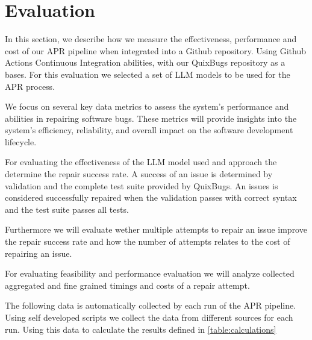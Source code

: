 \section{Evaluation} \label{section:evaluation}

In this section, we describe how we measure the effectiveness, performance and cost of our APR pipeline when integrated into a Github repository. Using Github Actions Continuous Integration abilities, with our QuixBugs repository as a bases.  For this evaluation we selected a set of LLM models to be used for the APR process.

We focus on several key data metrics to assess the system's performance and abilities in repairing software bugs. These metrics will provide insights into the system's efficiency, reliability, and overall impact on the software development lifecycle.

For evaluating the effectiveness of the LLM model used and approach the determine the repair success rate. A success of an issue is determined by validation and the complete test suite provided by QuixBugs. An issues is considered successfully repaired when the validation passes with correct syntax and the test suite passes all tests.

Furthermore we will evaluate wether multiple attempts to repair an issue improve the repair success rate and how the number of attempts relates to the cost of repairing an issue.

For evaluating feasibility and performance evaluation we will analyze collected aggregated and fine grained timings and costs of a repair attempt.

The following data is automatically collected by each run of the APR pipeline. Using self developed scripts we collect the data from different sources for each run. Using this data to calculate the results defined in \ref{table:calculations}

